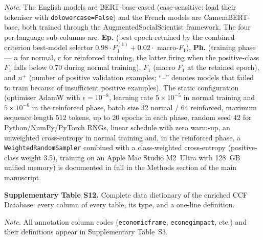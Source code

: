 \documentclass[12pt]{article}
\makeatletter
\let\CCFlandscape@orig\landscape
\renewcommand{\landscape}{%
  \CCFlandscape@orig
  \setlength{\textwidth}{\dimexpr\paperheight-5cm\relax}%
  \setlength{\linewidth}{\textwidth}%
  \setlength{\hsize}{\textwidth}%
  \setlength{\columnwidth}{\textwidth}%
}
\renewcommand\_{\texttt{\detokenize{_}\allowbreak}}
\makeatother
\begin{document}
\vspace{0.5em}
\noindent\footnotesize
\textit{Note.} The English models are BERT-base-cased (case-sensitive: load their tokeniser with \texttt{do\_lower\_case=False}) and the French models are CamemBERT-base, both trained through the AugmentedSocialScientist framework. The four per-language sub-columns are: \textbf{Ep.} (best epoch retained by the combined-criterion best-model selector $0.98 \cdot F_1^{(1)} + 0.02 \cdot$ macro-$F_1$), \textbf{Ph.} (training phase --- $n$ for normal, $r$ for reinforced training, the latter firing when the positive-class $F_1$ falls below 0.70 during normal training), \textbf{$F_1$} (macro $F_1$ at the retained epoch), and \textbf{$n^{+}$} (number of positive validation examples; ``--'' denotes models that failed to train because of insufficient positive examples). The static configuration (optimiser AdamW with $\epsilon=10^{-8}$, learning rate $5\times 10^{-5}$ in normal training and $5\times 10^{-6}$ in the reinforced phase, batch size 32 normal / 64 reinforced, maximum sequence length 512 tokens, up to 20 epochs in each phase, random seed 42 for Python/NumPy/PyTorch RNGs, linear schedule with zero warm-up, an unweighted cross-entropy in normal training and, in the reinforced phase, a \texttt{WeightedRandomSampler} combined with a class-weighted cross-entropy (positive-class weight 3.5), training on an Apple Mac Studio M2~Ultra with 128~GB unified memory) is documented in full in the Methods section of the main manuscript.

\endlandscape

\landscape
\noindent\textbf{Supplementary Table S12.} Complete data dictionary of the enriched CCF Database: every column of every table, its type, and a one-line definition.
\vspace{0.5em}

{\footnotesize

}

\vspace{0.5em}
\noindent\footnotesize
\textit{Note.} All annotation column codes (\texttt{economic\_frame}, \texttt{eco\_neg\_impact}, etc.) and their definitions appear in Supplementary Table~S3.

\endlandscape

\printbibliography[title={Supplementary references}]
\end{document}
